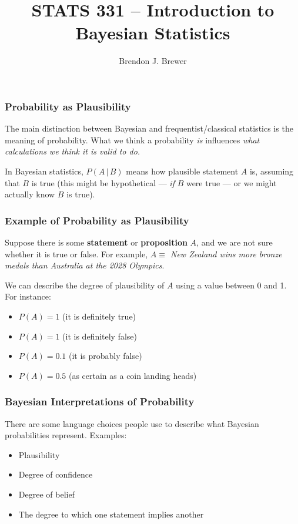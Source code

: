 \documentclass{beamer}
\author{Brendon J. Brewer}
\title{STATS 331 -- Introduction to Bayesian Statistics}
\institute{The University of Auckland}
\date{}
\newcommand{\given}{\,|\,}
\begin{document}
\frame{\titlepage}

\begin{frame}
\frametitle{Probability as Plausibility}
The main distinction between Bayesian and frequentist/classical statistics
is the meaning of probability. What we think a probability {\em is}
influences {\em what calculations we think it is valid to do.}\\[0.5em]\pause

In Bayesian statistics, $P(A \given B)$ means how plausible statement $A$ is,
assuming that $B$ is true (this might be hypothetical --- {\em if} $B$
were true --- or we might actually know $B$ is true).

\end{frame}



\begin{frame}
\frametitle{Example of Probability as Plausibility}
Suppose there is some {\bf statement}
or {\bf proposition} $A$, and we are not sure whether it is true or
false. For example, {\em $A \equiv$ New Zealand wins more bronze medals than
Australia at the 2028 Olympics}.\pause

We can describe the degree of plausibility of $A$ using a value between 0 and 1.
For instance:
\begin{itemize}
\item $P(A) = 1$ (it is definitely true) \\
\item $P(A) = 1$ (it is definitely false) \\
\item $P(A) = 0.1$ (it is probably false) \\
\item $P(A) = 0.5$ (as certain as a coin landing heads)
\end{itemize}

\end{frame}


\begin{frame}
\frametitle{Bayesian Interpretations of Probability}
There are some language choices people use to describe what
Bayesian probabilities represent. Examples:\pause

\begin{itemize}
\item Plausibility \pause
\item Degree of confidence \pause
\item Degree of belief \pause
\item The degree to which one statement implies another
\end{itemize}

\end{frame}
\end{document}
